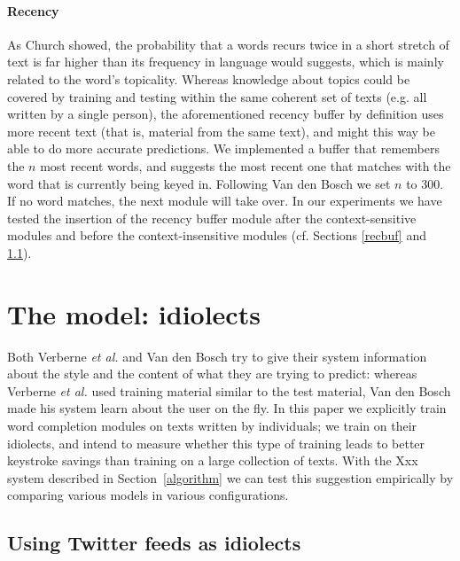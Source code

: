 \documentclass[11pt]{article}
\begin{document}
\paragraph{Recency} \label{rb}

As Church  showed, the probability that a words recurs twice in a short stretch of text is far higher than its  frequency in language would suggests, which is mainly related to the word's topicality. Whereas knowledge about topics could be covered by training and testing within the same coherent set of texts (e.g. all written by a single person), the aforementioned recency buffer by definition uses more recent text (that is, material from the same text), and might this way be able to do more accurate predictions. We implemented a buffer that remembers the $n$ most recent words, and suggests the most recent one that matches with the word that is currently being keyed in. Following Van den Bosch  we set $n$ to 300. If no word matches, the next module will take over. In our experiments we have tested the insertion of the recency buffer module after the context-sensitive modules and before the context-insensitive modules (cf. Sections \ref{recbuf} and \ref{twitter_idiolects}).


\section{The model: idiolects} \label{model}

Both Verberne {\em et al.}  and Van den Bosch  try to give their system information about the style and the content of what they are trying to predict: whereas Verberne {\em et al.}  used training material similar to the test material, Van den Bosch  made his system learn about the user on the fly. In this paper we explicitly train word completion modules on texts written by individuals; we train on their idiolects, and intend to measure whether this type of training leads to better keystroke savings than training on a large collection of texts. With the Xxx system described in Section~\ref{algorithm} we can test this suggestion empirically by comparing various models in various configurations.

\subsection{Using Twitter feeds as idiolects} \label{twitter_idiolects}
\end{document}
